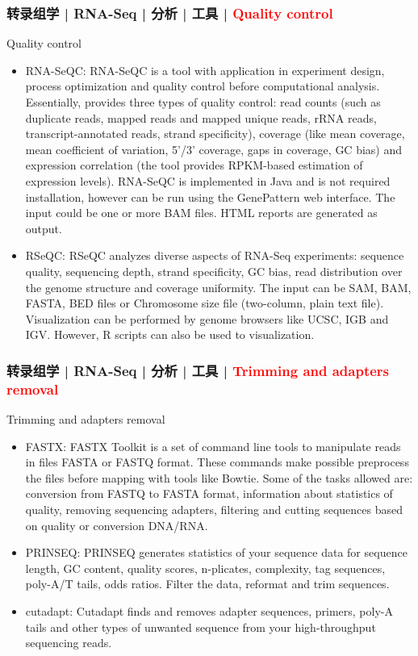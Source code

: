 \begin{frame}
  \frametitle{转录组学 | RNA-Seq | 分析 | 工具 | \textcolor{red}{Quality control}}
  {\footnotesize
  \begin{block}{Quality control}
    \begin{itemize}
      \item RNA-SeQC: RNA-SeQC is a tool with application in experiment design, process optimization and quality control before computational analysis. Essentially, provides three types of quality control: read counts (such as duplicate reads, mapped reads and mapped unique reads, rRNA reads, transcript-annotated reads, strand specificity), coverage (like mean coverage, mean coefficient of variation, 5'/3' coverage, gaps in coverage, GC bias) and expression correlation (the tool provides RPKM-based estimation of expression levels). RNA-SeQC is implemented in Java and is not required installation, however can be run using the GenePattern web interface. The input could be one or more BAM files. HTML reports are generated as output.
      \item RSeQC: RSeQC analyzes diverse aspects of RNA-Seq experiments: sequence quality, sequencing depth, strand specificity, GC bias, read distribution over the genome structure and coverage uniformity. The input can be SAM, BAM, FASTA, BED files or Chromosome size file (two-column, plain text file). Visualization can be performed by genome browsers like UCSC, IGB and IGV. However, R scripts can also be used to visualization.
    \end{itemize}
  \end{block}
  }
\end{frame}

\begin{frame}
  \frametitle{转录组学 | RNA-Seq | 分析 | 工具 | \textcolor{red}{Trimming and adapters removal}}
    {\footnotesize
  \begin{block}{Trimming and adapters removal}
    \begin{itemize}
      \item FASTX: FASTX Toolkit is a set of command line tools to manipulate reads in files FASTA or FASTQ format. These commands make possible preprocess the files before mapping with tools like Bowtie. Some of the tasks allowed are: conversion from FASTQ to FASTA format, information about statistics of quality, removing sequencing adapters, filtering and cutting sequences based on quality or conversion DNA/RNA.
      \item PRINSEQ: PRINSEQ generates statistics of your sequence data for sequence length, GC content, quality scores, n-plicates, complexity, tag sequences, poly-A/T tails, odds ratios. Filter the data, reformat and trim sequences.
      \item cutadapt: Cutadapt finds and removes adapter sequences, primers, poly-A tails and other types of unwanted sequence from your high-throughput sequencing reads.
    \end{itemize}
  \end{block}
  }
\end{frame}

